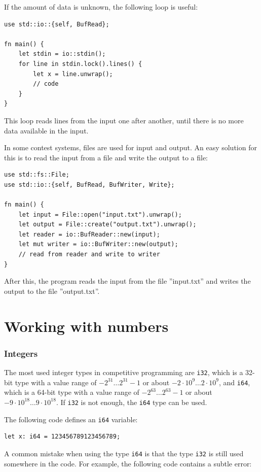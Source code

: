 If the amount of data is unknown, the following
loop is useful:
\begin{lstlisting}
use std::io::{self, BufRead};

fn main() {
    let stdin = io::stdin();
    for line in stdin.lock().lines() {
        let x = line.unwrap();
        // code
    }
}
\end{lstlisting}
This loop reads lines from the input
one after another, until there is no
more data available in the input.

In some contest systems, files are used for
input and output.
An easy solution for this is to read the input
from a file and write the output to a file:

\begin{lstlisting}
use std::fs::File;
use std::io::{self, BufRead, BufWriter, Write};

fn main() {
    let input = File::open("input.txt").unwrap();
    let output = File::create("output.txt").unwrap();
    let reader = io::BufReader::new(input);
    let mut writer = io::BufWriter::new(output);
    // read from reader and write to writer
}
\end{lstlisting}
After this, the program reads the input from the file
''input.txt'' and writes the output to the file
''output.txt''.

\section{Working with numbers}


\subsubsection{Integers}

The most used integer types in competitive programming
are \texttt{i32}, which is a 32-bit type with
a value range of $-2^{31} \ldots 2^{31}-1$
or about $-2 \cdot 10^9 \ldots 2 \cdot 10^9$,
and \texttt{i64}, which is a 64-bit type with
a value range of $-2^{63} \ldots 2^{63}-1$
or about $-9 \cdot 10^{18} \ldots 9 \cdot 10^{18}$.
If \texttt{i32} is not enough,
the \texttt{i64} type can be used.

The following code defines an
\texttt{i64} variable:
\begin{lstlisting}
let x: i64 = 123456789123456789;
\end{lstlisting}

A common mistake when using the type \texttt{i64}
is that the type \texttt{i32} is still used somewhere
in the code.
For example, the following code contains
a subtle error:

